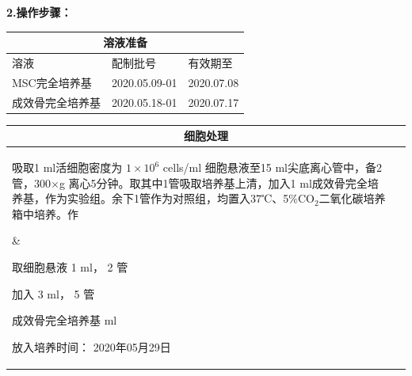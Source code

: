 \documentclass[UTF8,10pt,a4paper,fontset=fandol]{ctexart}
\newcommand{\fieldvalue}[1]{#1}
\newcommand{\handwritten}[1]{#1}
\begin{document}
\medskip
\noindent
\textbf{2.\quad 操作步骤：}

\begin{center}
\small
\begin{tabular}{|p{3.0cm}|p{4.1cm}|p{3.8cm}|}
\hline
\multicolumn{3}{|c|}{溶液准备} \\ \hline
溶液 & 配制批号 & 有效期至 \\ \hline
MSC完全培养基 &
\fieldvalue{\handwritten{2020.05.09-01}} &
\fieldvalue{\handwritten{2020.07.08}}
\\ \hline
成效骨完全培养基 &
\fieldvalue{\handwritten{2020.05.18-01}} &
\fieldvalue{\handwritten{2020.07.17}}
\\ \hline
\end{tabular}
\end{center}

\begin{tabular}{|p{6.7cm}|p{5.0cm}|}
\hline
\multicolumn{2}{|c|}{细胞处理} \\ \hline
\parbox[t]{6.4cm}{
吸取1 ml活细胞密度为 $1\times10^{6}$ cells/ml 细胞悬液至15 ml尖底离心管中，备2管，300$\times$g 离心5分钟。取其中1管吸取培养基上清，加入1 ml成效骨完全培养基，作为实验组。余下1管作为对照组，均置入37℃、5\%CO$_2$二氧化碳培养箱中培养。作
}
&
\parbox[t]{4.7cm}{
取细胞悬液
\fieldvalue{\handwritten{1}}
ml，
\fieldvalue{\handwritten{2}}
管

加入
\fieldvalue{\handwritten{3}}
ml，
\fieldvalue{\handwritten{5}}
管

成效骨完全培养基
\underline{\hspace{1.0cm}} ml

放入培养时间：
\fieldvalue{\handwritten{2020年05月29日}}
}
\\ \hline
\end{tabular}
\end{document}
